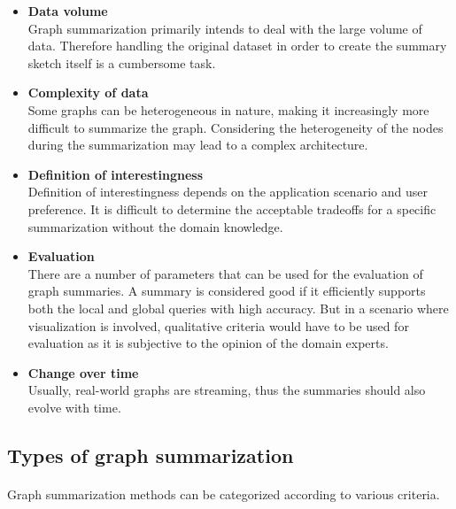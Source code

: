 \begin{itemize}
    \item \textbf{Data volume}\\
          Graph summarization primarily intends to deal with the large volume of data. Therefore handling the original dataset in order to create the summary sketch itself is a cumbersome task.

    \item \textbf{Complexity of data}\\
          Some graphs can be heterogeneous in nature, making it increasingly more difficult to summarize the graph. Considering the heterogeneity of the nodes during the summarization may lead to a complex architecture\cite{kivela_multilayer_2014}.

    \item \textbf{Definition of interestingness}\\
          Definition of interestingness depends on the application scenario and user preference. It is difficult to determine the acceptable tradeoffs for a specific summarization without the domain knowledge.

    \item \textbf{Evaluation}\\
          There are a number of parameters that can be used for the evaluation of graph summaries. A summary is considered good if it efficiently supports both the local and global queries with high accuracy. But in a scenario where visualization is involved, qualitative criteria would have to be used for evaluation as it is subjective to the opinion of the domain experts.

    \item \textbf{Change over time}\\
          Usually, real-world graphs are streaming, thus the summaries should also evolve with time\cite{leskovec_graphs_2005}.
\end{itemize}

\subsection{Types of graph summarization}
\label{section:sumtypes}

\paragraph{}
Graph summarization methods can be categorized according to various criteria.


